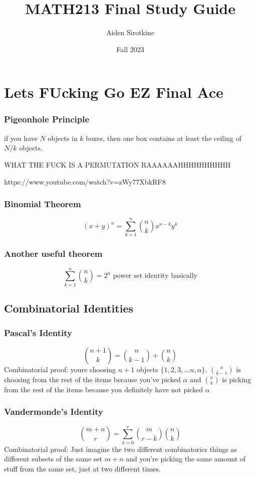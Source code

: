 \documentclass{report}
\date{Fall 2023}
\title{MATH213 Final Study Guide}
\author{Aiden Sirotkine}
\begin{document}
\maketitle{}

\tableofcontents

\chapter{Lets FUcking Go EZ Final Ace}


\subsection{Pigeonhole Principle}
if you have $N$ objects in $k$ boxes, then one box contains at least the ceiling of $N/k$ objects.

WHAT THE FUCK IS A PERMUTATION RAAAAAAHHHHHHHHHH

https://www.youtube.com/watch?v=zWy77XbkRF8


\subsection{Binomial Theorem}
\[
(x + y)^n = \sum_{k = 1}^n {n \choose k} x^{n-k}y^k
\]


\subsection{Another useful theorem}
\[
\sum_{k=1}^n {n \choose k} = 2^n
\textrm{ power set identity basically}
\]



\section{Combinatorial Identities}

\subsection{Pascal's Identity}
\[
{n+ 1 \choose k} = {n \choose k-1} + {n \choose k}
\]
Combinatorial proof: youre choosing $n+1$ objects $\{ 1,2, 3 ,\ldots n, \alpha\}$.
 ${n \choose k-1}$ is choosing from the rest of the items because you've picked 
 $\alpha$ and ${n \choose k}$ is picking from the rest of the items because you definitely have not picked 
 $\alpha$
 
 
 \subsection{Vandermonde's Identity}
 \[
 {m + n \choose r} = \sum_{k = 0}^r {m \choose r - k} {n \choose k}
 \]
 Combinatorial proof: Just imagine the two different combinatorics things as different subsets of the same set $m + n$ and you're picking the same amount of stuff from the same set, just at two different times.
 
\end{document}
